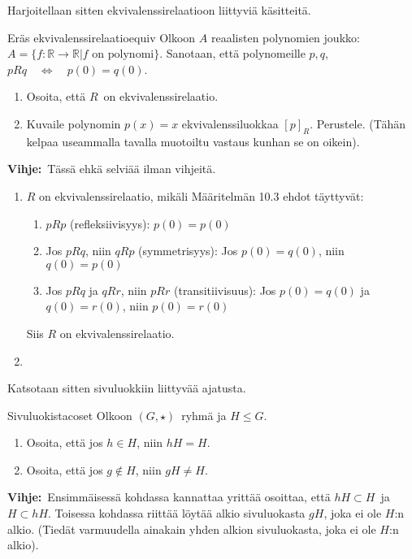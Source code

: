 \documentclass[11pt,a4paper]{amsart}
\newcommand{\R}{\mathbb{R}}
\newcommand{\1}{\mathbf{1}}
\begin{document}
Harjoitellaan sitten ekvivalenssirelaatioon liittyviä käsitteitä. 
\begin{Exercises}{Eräs ekvivalenssirelaatio}{equiv}
Olkoon $A$ reaalisten polynomien joukko: $A=\{f:\R\to \R| f \text{ on polynomi}\}$. Sanotaan, että polynomeille $p,q$, $pRq \quad \Leftrightarrow \quad p(0)=q(0)$. 
\begin{enumerate}
\item Osoita, että $R$ on ekvivalenssirelaatio.
\item Kuvaile polynomin $p(x)=x$ ekvivalenssiluokkaa $[p]_R$. Perustele. (Tähän kelpaa useammalla tavalla muotoiltu vastaus kunhan se on oikein).
\end{enumerate}
{\bf Vihje:} Tässä ehkä selviää ilman vihjeitä.
\end{Exercises}

\pagebreak

\begin{Solution}
  \begin{enumerate}
    \item $R$ on ekvivalenssirelaatio, mikäli Määritelmän 10.3 ehdot täyttyvät: \begin{enumerate}
      \item $pRp$ (refleksiivisyys): $p(0)=p(0)$
      \item Jos $pRq$, niin $qRp$ (symmetrisyys): Jos $p(0)=q(0)$, niin $q(0)=p(0)$
      \item Jos $pRq$ ja $qRr$, niin $pRr$ (transitiivisuus): Jos $p(0)=q(0)$ ja $q(0)=r(0)$, niin $p(0)=r(0)$
    \end{enumerate}
    Siis $R$ on ekvivalenssirelaatio.
    \item 
  \end{enumerate}
\end{Solution}

Katsotaan sitten sivuluokkiin liittyvää ajatusta. 
\begin{Exercises}{Sivuluokista}{coset}
Olkoon $(G,\star)$ ryhmä ja $H\leq G$. 
\begin{enumerate}
\item  Osoita, että jos $h\in H$, niin $hH=H$.
\item Osoita, että jos $g\notin H$, niin $gH\neq H$. 
\end{enumerate}
{\bf Vihje:} Ensimmäisessä kohdassa kannattaa yrittää osoittaa, että $hH\subset H$ ja $H\subset hH$. Toisessa kohdassa riittää löytää alkio sivuluokasta $gH$, joka ei ole $H$:n alkio. (Tiedät varmuudella ainakain yhden alkion sivuluokasta, joka ei ole $H$:n alkio).
\end{Exercises}
\end{document}
